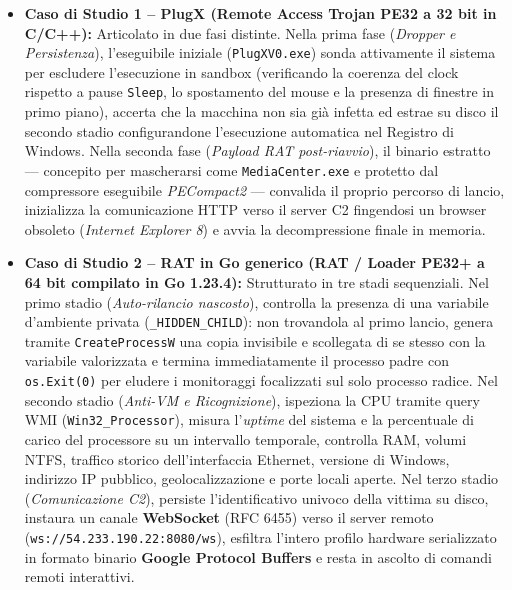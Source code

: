 \documentclass[11pt, a4paper]{article}
\begin{document}
\begin{itemize}
	\item \textbf{Caso di Studio 1 -- PlugX (Remote Access Trojan PE32 a 32 bit in C/C++):} Articolato in due fasi distinte. Nella prima fase (\textit{Dropper e Persistenza}), l'eseguibile iniziale (\texttt{PlugXV0.exe}) sonda attivamente il sistema per escludere l'esecuzione in sandbox (verificando la coerenza del clock rispetto a pause \texttt{Sleep}, lo spostamento del mouse e la presenza di finestre in primo piano), accerta che la macchina non sia gi\`a infetta ed estrae su disco il secondo stadio configurandone l'esecuzione automatica nel Registro di Windows. Nella seconda fase (\textit{Payload RAT post-riavvio}), il binario estratto --- concepito per mascherarsi come \texttt{Media\allowbreak{}Center.\allowbreak{}exe} e protetto dal compressore eseguibile \textit{PECompact2} --- convalida il proprio percorso di lancio, inizializza la comunicazione HTTP verso il server C2 fingendosi un browser obsoleto (\textit{Internet Explorer 8}) e avvia la decompressione finale in memoria.
	
	\item \textbf{Caso di Studio 2 -- RAT in Go generico (RAT / Loader PE32+ a 64 bit compilato in Go 1.23.4):} Strutturato in tre stadi sequenziali. Nel primo stadio (\textit{Auto-rilancio nascosto}), controlla la presenza di una variabile d'ambiente privata (\texttt{\_\allowbreak{}HIDDEN\_\allowbreak{}CHILD}): non trovandola al primo lancio, genera tramite \texttt{Create\allowbreak{}ProcessW} una copia invisibile e scollegata di se stesso con la variabile valorizzata e termina immediatamente il processo padre con \texttt{os.Exit(0)} per eludere i monitoraggi focalizzati sul solo processo radice. Nel secondo stadio (\textit{Anti-VM e Ricognizione}), ispeziona la CPU tramite query WMI (\texttt{Win32\_\allowbreak{}Processor}), misura l'\textit{uptime} del sistema e la percentuale di carico del processore su un intervallo temporale, controlla RAM, volumi NTFS, traffico storico dell'interfaccia Ethernet, versione di Windows, indirizzo IP pubblico, geolocalizzazione e porte locali aperte. Nel terzo stadio (\textit{Comunicazione C2}), persiste l'identificativo univoco della vittima su disco, instaura un canale \textbf{WebSocket} (RFC 6455) verso il server remoto (\texttt{ws://\allowbreak{}54.233.190.22:8080/\allowbreak{}ws}), esfiltra l'intero profilo hardware serializzato in formato binario \textbf{Google Protocol Buffers} e resta in ascolto di comandi remoti interattivi.
	

\end{itemize}
\end{document}

